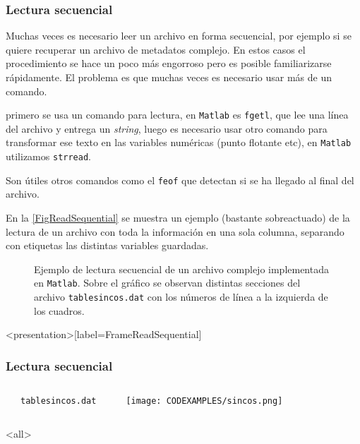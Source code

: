 \subsubsection{Lectura secuencial}


Muchas veces es necesario leer un archivo en forma 
secuencial, por ejemplo si se quiere recuperar 
un archivo de metadatos complejo. En estos casos
el procedimiento se hace un poco más engorroso pero 
es posible familiarizarse rápidamente. El problema
es que muchas veces es necesario usar más de un comando.

primero se usa un comando para lectura, en \texttt{Matlab}
es \texttt{fgetl}, que lee una línea del archivo y entrega un 
\emph{string}, luego es necesario usar otro comando para 
transformar ese texto en las variables numéricas (punto flotante 
etc), en \texttt{Matlab} utilizamos \texttt{strread}. 

Son útiles otros comandos como el \texttt{feof} que detectan 
si se ha llegado al final del archivo.

En la \autoref{FigReadSequential} se muestra un ejemplo (bastante sobreactuado)
de la lectura de un archivo con toda la información en una sola columna, separando
con etiquetas las distintas variables guardadas.

\begin{figure}

  \caption{
    \protect\label{FigReadSequential}
      Ejemplo de lectura secuencial de un archivo complejo implementada 
      en \texttt{Matlab}. Sobre el gráfico se observan distintas secciones
      del archivo \texttt{tablesincos.dat} con los números de línea a la
      izquierda de los cuadros.
    }
  
\end{figure}

\mode*

\begin{frame}<presentation>[label=FrameReadSequential]
  \frametitle{Lectura secuencial}

  \begin{columns}
    \begin{codeblock}
    \end{codeblock}
    \scriptsize\texttt{tablesincos.dat}
    \begin{columns}
    \end{columns}
    \center
    \texttt{[image: CODEXAMPLES/sincos.png]}
  \end{columns}

\end{frame}

\mode<all>
